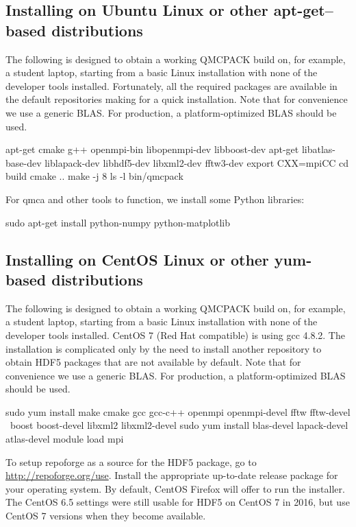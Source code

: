 \subsection{Installing on Ubuntu Linux or other apt-get--based distributions}
\label{sec:buildubuntu}

The following is designed to obtain a working QMCPACK build on, for example, a
student laptop, starting from a basic Linux installation with none of
the developer tools installed. Fortunately, all the required packages
are available in the default repositories making for a quick
installation. Note that for convenience we use a generic BLAS. For
production, a platform-optimized BLAS should be used.

\begin{shade}
apt-get cmake g++ openmpi-bin libopenmpi-dev libboost-dev
apt-get libatlas-base-dev liblapack-dev libhdf5-dev libxml2-dev fftw3-dev
export CXX=mpiCC
cd build
cmake ..
make -j 8
ls -l bin/qmcpack
\end{shade}

For qmca and other tools to function, we install some Python libraries:

\begin{shade}
sudo apt-get install python-numpy python-matplotlib
\end{shade}

\subsection{Installing on CentOS Linux or other yum-based distributions}

The following is designed to obtain a working QMCPACK build on, for example, a
student laptop, starting from a basic Linux installation with none of
the developer tools installed. CentOS 7 (Red Hat compatible) is using
gcc 4.8.2. The installation is complicated only by the need to install
another repository to obtain HDF5 packages that are not available by
default. Note that for convenience we use a generic BLAS. For
production, a platform-optimized BLAS should be used.

\begin{shade}
sudo yum install make cmake gcc gcc-c++ openmpi openmpi-devel fftw fftw-devel \
                  boost boost-devel libxml2 libxml2-devel
sudo yum install blas-devel lapack-devel atlas-devel
module load mpi
\end{shade}

To setup repoforge as a source for the HDF5 package, go to
\url{http://repoforge.org/use}. Install the appropriate up-to-date
release package for your operating system. By default, CentOS Firefox will offer
to run the installer. The CentOS 6.5 settings were still usable for HDF5 on
CentOS 7 in 2016, but use CentOS 7 versions when they become
available.


